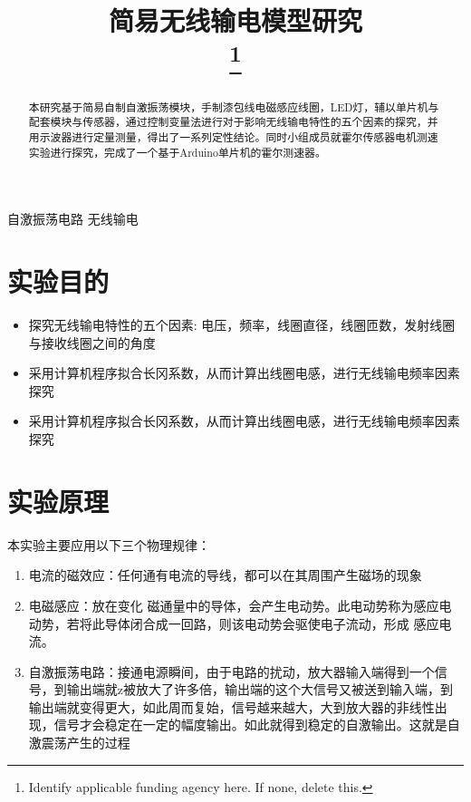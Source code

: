 \documentclass[conference]{IEEEtran}
\theoremstyle{break}
\begin{document}
\title{简易无线输电模型研究\\
{\footnotesize }
\thanks{Identify applicable funding agency here. If none, delete this.}
}

\author{
\and
{}
\and
{}
}

\maketitle

\begin{abstract}
        本研究基于简易自制自激振荡模块，手制漆包线电磁感应线圈，LED灯，辅以单片机与配套模块与传感器，通过控制变量法进行对于影响无线输电特性的五个因素的探究，并用示波器进行定量测量，得出了一系列定性结论。同时小组成员就霍尔传感器电机测速实验进行探究，完成了一个基于Arduino单片机的霍尔测速器。
\end{abstract}

\begin{IEEEkeywords}
        自激振荡电路   无线输电 
\end{IEEEkeywords}

\section{实验目的}
\begin{itemize}
        \item 探究无线输电特性的五个因素: 电压，频率，线圈直径，线圈匝数，发射线圈与接收线圈之间的角度
        \item 采用计算机程序拟合长冈系数，从而计算出线圈电感，进行无线输电频率因素探究
        \item 采用计算机程序拟合长冈系数，从而计算出线圈电感，进行无线输电频率因素探究
\end{itemize}

\section{实验原理}
本实验主要应用以下三个物理规律：
\begin{enumerate}
        \item 电流的磁效应：任何通有电流的导线，都可以在其周围产生磁场的现象
        \item 电磁感应：放在变化	磁通量中的导体，会产生电动势。此电动势称为感应电动势，若将此导体闭合成一回路，则该电动势会驱使电子流动，形成	感应电流。
        \item 自激振荡电路：接通电源瞬间，由于电路的扰动，放大器输入端得到一个信号，到输出端就z被放大了许多倍，输出端的这个大信号又被送到输入端，到输出端就变得更大，如此周而复始，信号越来越大，大到放大器的非线性出现，信号才会稳定在一定的幅度输出。如此就得到稳定的自激输出。这就是自激震荡产生的过程
\end{enumerate}
\end{document}

